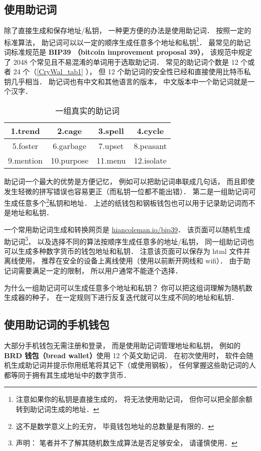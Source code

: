 \subsection{使用助记词}
除了直接生成和保存地址/私钥， 一种更方便的办法是使用助记词． 按照一定的标准算法， 助记词可以以一定的顺序生成任意多个地址和私钥\footnote{注意如果你的私钥是直接生成的， 将无法使用助记词， 但你可以把全部余额转到助记词生成的地址．}． 最常见的助记词标准规范是 \textbf{BIP39 （bitcoin improvement proposal 39）}， 该规范中规定了 2048 个常见且不易混淆的单词用于选取助记词． 常见的助记词个数是 12 个或者 24 个（\autoref{CryWal_tab1} ）， 但 12 个助记词的安全性已经和直接使用比特币私钥几乎相当． 助记词也有中文和其他语言的版本， 中文版本中一个助记词就是一个汉字．
\begin{table}[ht]
\centering
\caption{一组真实的助记词}\label{CryWal_tab1}
\begin{tabular}{|c|c|c|c|}
\hline
1.trend & 2.cage & 3.spell & 4.cycle \\
\hline
5.foster & 6.garbage & 7.upset & 8.peasant \\
\hline
9.mention & 10.purpose & 11.menu & 12.isolate \\
\hline
\end{tabular}
\end{table}

助记词一个最大的优势是方便记忆， 例如可以把助记词串联成几句话， 而且即使发生轻微的拼写错误也容易更正（而私钥一位都不能出错）． 第二是一组助记词可生成任意多个\footnote{这不是数学意义上的无穷， 毕竟钱包地址的总数量是有限的．}私钥和地址． 上述的纸钱包和钢板钱包也可以用于记录助记词而不是地址和私钥．

一个常用助记词生成和转换网页是 \href{https://iancoleman.io/bip39/}{hiancoleman.io/bip39}． 该页面可以随机生成助记词\footnote{声明： 笔者并不了解其随机数生成算法是否足够安全， 请谨慎使用．}， 以及选择不同的算法按顺序生成任意多的地址/私钥， 同一组助记词也可以生成多种数字货币的钱包地址和私钥． 注意该页面可以保存为 html 文件并离线使用， 推荐在安全的设备上离线使用（使用以前断开网线和 wifi）． 由于助记词需要满足一定的限制， 所以用户通常不能逐个选择．

为什么一组助记词可以生成任意多个地址和私钥？ 你可以把这组词理解为随机数生成器的种子， 在一定规则下进行反复迭代就可以生成不同的地址和私钥．

\subsection{使用助记词的手机钱包}
大部分手机钱包无需注册和登录， 而是使用助记词管理地址和私钥， 例如的 \textbf{BRD 钱包（bread wallet）}使用 12 个英文助记词． 在初次使用时， 软件会随机生成助记词并提示你用纸笔将其记下（或使用钢板）， 任何掌握这些助记词的人都等同于拥有其生成地址中的数字货币．

